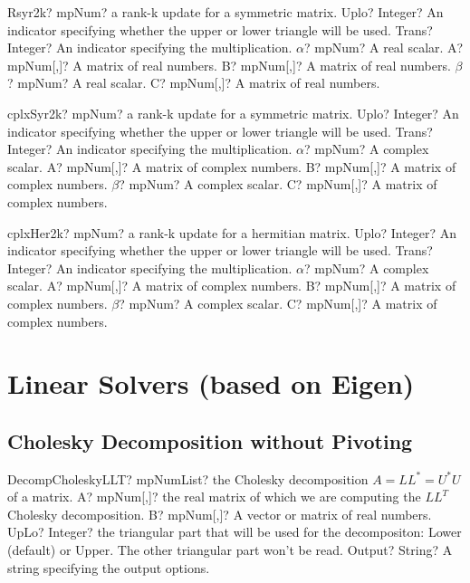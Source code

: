 \documentclass[12pt,a4paper,openany]{book}
\begin{document}
\begin{mpFunctionsExtract}
\mpFunctionSeven
{Rsyr2k? mpNum? a rank-k update for a symmetric matrix.}
{Uplo? Integer? An indicator specifying whether the upper or lower triangle will be used.}
{Trans? Integer? An indicator specifying the multiplication.}
{$\alpha$? mpNum? A real scalar.}
{A? mpNum[,]? A matrix of real numbers.}
{B? mpNum[,]? A matrix of real numbers.}
{$\beta$? mpNum? A real scalar.}
{C? mpNum[,]? A matrix of real numbers.}
\end{mpFunctionsExtract}

\begin{mpFunctionsExtract}
\mpFunctionSeven
{cplxSyr2k? mpNum? a rank-k update for a symmetric matrix.}
{Uplo? Integer? An indicator specifying whether the upper or lower triangle will be used.}
{Trans? Integer? An indicator specifying the multiplication.}
{$\alpha$? mpNum? A complex scalar.}
{A? mpNum[,]? A matrix of complex numbers.}
{B? mpNum[,]? A matrix of complex numbers.}
{$\beta$? mpNum? A complex scalar.}
{C? mpNum[,]? A matrix of complex numbers.}
\end{mpFunctionsExtract}

\begin{mpFunctionsExtract}
\mpFunctionSeven
{cplxHer2k? mpNum? a rank-k update for a hermitian matrix.}
{Uplo? Integer? An indicator specifying whether the upper or lower triangle will be used.}
{Trans? Integer? An indicator specifying the multiplication.}
{$\alpha$? mpNum? A complex scalar.}
{A? mpNum[,]? A matrix of complex numbers.}
{B? mpNum[,]? A matrix of complex numbers.}
{$\beta$? mpNum? A complex scalar.}
{C? mpNum[,]? A matrix of complex numbers.}
\end{mpFunctionsExtract}

\chapter{Linear Solvers (based on Eigen)}

\section{Cholesky Decomposition without Pivoting}

\begin{mpFunctionsExtract}
\mpFunctionFour
{DecompCholeskyLLT? mpNumList? the Cholesky decomposition $A = LL^* = U^*U$ of a matrix.}
{A? mpNum[,]? the real matrix of which we are computing the $LL^T$ Cholesky decomposition.}
{B? mpNum[,]? A vector or matrix of real numbers.}
{UpLo? Integer? the triangular part that will be used for the decompositon: Lower (default) or Upper. The other triangular part won't be read.}
{Output? String? A string specifying the output options.}
\end{mpFunctionsExtract}
\end{document}
